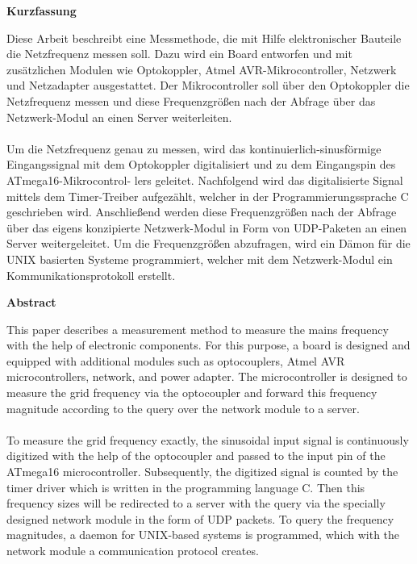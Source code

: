 \newpage
\pagestyle{plain}
\null\vfil

\begin{center}\bf Kurzfassung\end{center}
Diese Arbeit beschreibt eine Messmethode, die mit Hilfe elektronischer Bauteile die Netzfrequenz messen soll. Dazu wird ein Board entworfen und mit zusätzlichen Modulen wie Optokoppler, Atmel AVR-Mikrocontroller, Netzwerk und Netzadapter ausgestattet. Der Mikrocontroller soll über den Optokoppler die Netzfrequenz messen und diese Frequenzgrößen nach der Abfrage über das Netzwerk-Modul an einen Server weiterleiten. \\ \\
Um die Netzfrequenz genau zu messen, wird das kontinuierlich-sinusförmige Eingangssignal mit dem Optokoppler digitalisiert und zu dem Eingangspin des ATmega16-Mikrocontrol- lers geleitet. Nachfolgend wird das digitalisierte Signal mittels dem Timer-Treiber aufgezählt, welcher in der Programmierungssprache C geschrieben wird. Anschließend werden diese Frequenzgrößen nach der Abfrage über das eigens konzipierte Netzwerk-Modul in Form von UDP-Paketen an einen Server weitergeleitet. Um die Frequenzgrößen abzufragen, wird ein Dämon für die UNIX basierten Systeme programmiert, welcher mit dem Netzwerk-Modul ein Kommunikationsprotokoll erstellt.

\par\vfil

\begin{center}\bf Abstract\end{center}
This paper describes a measurement method to measure the mains frequency with the help of electronic components. For this purpose, a board is designed and equipped with additional modules such as optocouplers, Atmel AVR microcontrollers, network, and power adapter. The microcontroller is designed to measure the grid frequency via the optocoupler and forward this frequency magnitude according to the query over the network module to a server. \\ \\To measure the grid frequency exactly, the sinusoidal input signal is continuously digitized with the help of the optocoupler and passed to the input pin of the ATmega16 microcontroller. Subsequently, the digitized signal is counted by the timer driver which is written in the programming language C. Then this frequency sizes will be redirected  to a server with the query via the specially designed network module in the form of UDP packets. To query the frequency magnitudes, a daemon for UNIX-based systems is programmed, which with the network module a communication protocol creates.

\par\vfil\null
